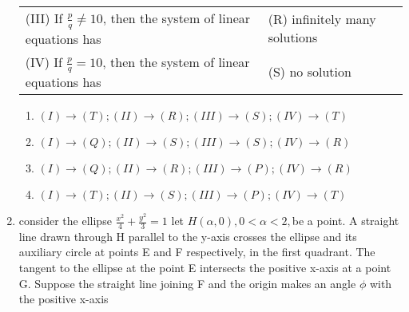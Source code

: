 \documentclass{article}
\begin{document}
\begin{enumerate}
\begin{center}
\begin{tabular}{l l}
	(III) If \( \frac{p}{q} \neq 10 \), then the system of linear equations has & (R) infinitely many solutions \\                              
	(IV) If \( \frac{p}{q} = 10 \), then the system of linear equations has & (S) no solution \\
	\end{tabular}                                          \end{center}

\begin{enumerate}[label=\Alph*.]		
	\item $(I)\to(T);(II)\to(R);(III)\to(S);(IV)\to(T)$
	\item $(I)\to(Q);(II)\to(S);(III)\to(S);(IV)\to(R)$   
	\item $(I)\to(Q);(II)\to(R);(III)\to(P);(IV)\to(R)$
	\item $(I)\to(T);(II)\to(S);(III)\to(P);(IV)\to(T)$
\end{enumerate}

	\item consider the ellipse $\frac{x^2}{4}+\frac{y^2}{3}=1$ let $H(\alpha,0),0<\alpha<2,$be a point. A straight line drawn through H parallel to the y-axis crosses the ellipse and its auxiliary circle at points E and F respectively, in the first quadrant. The tangent to the ellipse at the point E intersects the positive x-axis at a point G. Suppose the straight line joining F and the origin makes an angle $\phi$ with the positive x-axis


\end{enumerate}
\end{document}
